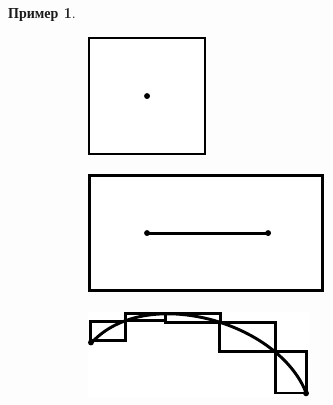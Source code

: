 \documentclass[a4paper, 14pt]{report}
\theoremstyle{definition}
\newtheorem*{example}{Пример}
\begin{document}
\begin{example}
			\begin{figure}[!h]
				\centering
				\begin{subfigure}{0.20\linewidth}
					\centering
					\includegraphics[width=1\linewidth]{zeroS_dot}
					\caption{}
					\label{fig:zero_s_dot}
				\end{subfigure}
				\hfill
				\begin{subfigure}{0.30\linewidth}
					\centering
					\includegraphics[width=1\linewidth]{zeroS_segment}
					\caption{}
					\label{fig:zero_s_segment}
				\end{subfigure}
				\hfill
				\begin{subfigure}{0.35\linewidth}
					\centering
					\includegraphics[width=1\linewidth]{zeroS_curve}

\end{subfigure}
\end{figure}
\end{example}
\end{document}
